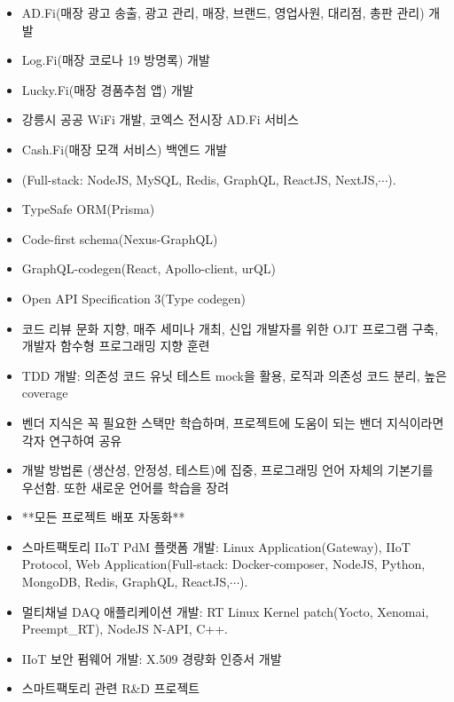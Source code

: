 \documentclass[10pt,a4paper,ragged2e]{altacv}
\begin{document}
\begin{fullwidth}
	\begin{itemize}
		\item AD.Fi(매장 광고 송출, 광고 관리, 매장, 브랜드, 영업사원, 대리점, 총판 관리) 개발
		\item Log.Fi(매장 코로나 19 방명록) 개발
		\item Lucky.Fi(매장 경품추첨 앱) 개발
		\item 강릉시 공공 WiFi 개발, 코엑스 전시장 AD.Fi 서비스
		\item Cash.Fi(매장 모객 서비스) 백엔드 개발
		\item (Full-stack: NodeJS, MySQL, Redis, GraphQL, ReactJS, NextJS,$\cdots$).
		\item TypeSafe ORM(Prisma)
		\item Code-first schema(Nexus-GraphQL)
		\item GraphQL-codegen(React, Apollo-client, urQL)
		\item Open API Specification 3(Type codegen)
		\item 코드 리뷰 문화 지향, 매주 세미나 개최, 신입 개발자를 위한 OJT 프로그램 구축, 개발자 함수형 프로그래밍 지향 훈련
		\item TDD 개발: 의존성 코드 유닛 테스트 mock을 활용, 로직과 의존성 코드 분리, 높은 coverage
		\item 벤더 지식은 꼭 필요한 스택만 학습하며, 프로젝트에 도움이 되는 밴더 지식이라면 각자 연구하여 공유
		\item 개발 방법론 (생산성, 안정성, 테스트)에 집중, 프로그래밍 언어 자체의 기본기를 우선함. 또한 새로운 언어를 학습을 장려
		\item **모든 프로젝트 배포 자동화**
	\end{itemize}

	\divider

	\begin{itemize}
		\item 스마트팩토리 IIoT PdM 플랫폼 개발: Linux Application(Gateway), IIoT Protocol, Web Application(Full-stack: Docker-composer, NodeJS, Python, MongoDB, Redis, GraphQL, ReactJS,$\cdots$).
		\item 멀티채널 DAQ 애플리케이션 개발: RT Linux Kernel patch(Yocto, Xenomai, Preempt\_RT), NodeJS N-API, C++.
		\item IIoT 보안 펌웨어 개발: X.509 경량화 인증서 개발
		\item 스마트팩토리 관련 R\&D 프로젝트
	\end{itemize}


\end{fullwidth}
\end{document}
